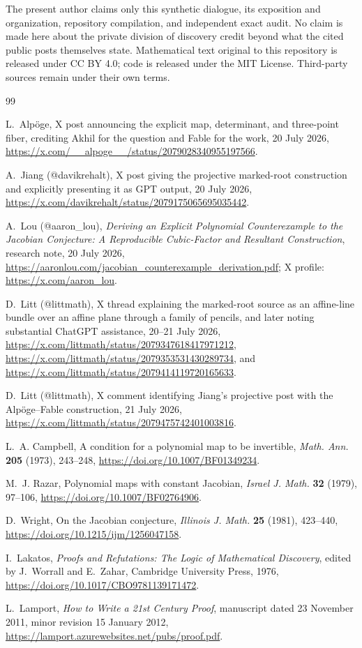 \documentclass[11pt,a4paper]{article}
\numberwithin{equation}{section}
\theoremstyle{definition}
\theoremstyle{remark}
\begin{document}
The present author claims only this synthetic dialogue, its exposition and
organization, repository compilation, and independent exact audit.  No claim
is made here about the private division of discovery credit beyond what the
cited public posts themselves state.  Mathematical text original to this
repository is released under CC BY 4.0; code is released under the MIT
License.  Third-party sources remain under their own terms.

\begingroup\small
\begin{thebibliography}{99}

L.~Alp\"oge,
X post announcing the explicit map, determinant, and three-point fiber,
crediting Akhil for the question and Fable for the work,
20 July 2026,
\url{https://x.com/__alpoge__/status/2079028340955197566}.

A.~Jiang (@davikrehalt),
X post giving the projective marked-root construction and explicitly
presenting it as GPT output,
20 July 2026,
\url{https://x.com/davikrehalt/status/2079175065695035442}.

A.~Lou (@aaron\_lou),
\emph{Deriving an Explicit Polynomial Counterexample to the Jacobian
Conjecture: A Reproducible Cubic-Factor and Resultant Construction},
research note, 20 July 2026,
\url{https://aaronlou.com/jacobian_counterexample_derivation.pdf};
X profile: \url{https://x.com/aaron_lou}.

D.~Litt (@littmath),
X thread explaining the marked-root source as an affine-line bundle over an
affine plane through a family of pencils, and later noting substantial
ChatGPT assistance,
20--21 July 2026,
\url{https://x.com/littmath/status/2079347618417971212},
\url{https://x.com/littmath/status/2079353531430289734}, and
\url{https://x.com/littmath/status/2079414119720165633}.

D.~Litt (@littmath),
X comment identifying Jiang's projective post with the Alp\"oge--Fable
construction,
21 July 2026,
\url{https://x.com/littmath/status/2079475742401003816}.

L.~A. Campbell,
A condition for a polynomial map to be invertible,
\emph{Math. Ann.} \textbf{205} (1973), 243--248,
\url{https://doi.org/10.1007/BF01349234}.

M.~J. Razar,
Polynomial maps with constant Jacobian,
\emph{Israel J. Math.} \textbf{32} (1979), 97--106,
\url{https://doi.org/10.1007/BF02764906}.

D.~Wright,
On the Jacobian conjecture,
\emph{Illinois J. Math.} \textbf{25} (1981), 423--440,
\url{https://doi.org/10.1215/ijm/1256047158}.

I.~Lakatos,
\emph{Proofs and Refutations: The Logic of Mathematical Discovery},
edited by J.~Worrall and E.~Zahar,
Cambridge University Press, 1976,
\url{https://doi.org/10.1017/CBO9781139171472}.

L.~Lamport,
\emph{How to Write a 21st Century Proof},
manuscript dated 23 November 2011, minor revision 15 January 2012,
\url{https://lamport.azurewebsites.net/pubs/proof.pdf}.

\end{thebibliography}
\endgroup
\end{document}
